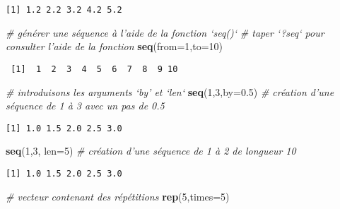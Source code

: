 \documentclass[
]{article}
\newenvironment{Shaded}{\begin{snugshade}}{\end{snugshade}}
\newcommand{\CommentTok}[1]{\textcolor[rgb]{0.56,0.35,0.01}{\textit{#1}}}
\newcommand{\DataTypeTok}[1]{\textcolor[rgb]{0.13,0.29,0.53}{#1}}
\newcommand{\DecValTok}[1]{\textcolor[rgb]{0.00,0.00,0.81}{#1}}
\newcommand{\FloatTok}[1]{\textcolor[rgb]{0.00,0.00,0.81}{#1}}
\newcommand{\KeywordTok}[1]{\textcolor[rgb]{0.13,0.29,0.53}{\textbf{#1}}}
\newcommand{\NormalTok}[1]{#1}
\begin{document}
\begin{verbatim}
[1] 1.2 2.2 3.2 4.2 5.2
\end{verbatim}

\begin{Shaded}
\begin{Highlighting}[]
\CommentTok{# générer une séquence à l'aide de la fonction `seq()`}
\CommentTok{# taper `?seq` pour consulter l'aide de la fonction}
\KeywordTok{seq}\NormalTok{(}\DataTypeTok{from=}\DecValTok{1}\NormalTok{,}\DataTypeTok{to=}\DecValTok{10}\NormalTok{)}
\end{Highlighting}
\end{Shaded}

\begin{verbatim}
 [1]  1  2  3  4  5  6  7  8  9 10
\end{verbatim}

\begin{Shaded}
\begin{Highlighting}[]
\CommentTok{# introduisons les arguments `by' et `len`}
\KeywordTok{seq}\NormalTok{(}\DecValTok{1}\NormalTok{,}\DecValTok{3}\NormalTok{,}\DataTypeTok{by=}\FloatTok{0.5}\NormalTok{)  }\CommentTok{# création d'une séquence de 1 à 3 avec un pas de 0.5}
\end{Highlighting}
\end{Shaded}

\begin{verbatim}
[1] 1.0 1.5 2.0 2.5 3.0
\end{verbatim}

\begin{Shaded}
\begin{Highlighting}[]
\KeywordTok{seq}\NormalTok{(}\DecValTok{1}\NormalTok{,}\DecValTok{3}\NormalTok{, }\DataTypeTok{len=}\DecValTok{5}\NormalTok{) }\CommentTok{# création d'une séquence de 1 à 2 de longueur 10}
\end{Highlighting}
\end{Shaded}

\begin{verbatim}
[1] 1.0 1.5 2.0 2.5 3.0
\end{verbatim}

\begin{Shaded}
\begin{Highlighting}[]
\CommentTok{# vecteur contenant des répétitions}
\KeywordTok{rep}\NormalTok{(}\DecValTok{5}\NormalTok{,}\DataTypeTok{times=}\DecValTok{5}\NormalTok{)}
\end{Highlighting}
\end{Shaded}
\end{document}
